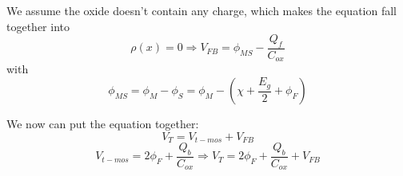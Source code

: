 We assume the oxide doesn't contain any charge, which makes the equation fall together into
\begin{equation}
\rho(x)=0
\Rightarrow
V_{FB}
=
\phi_{MS}-\frac{Q_f}{C_{ox}}
\end{equation}
with
\begin{equation}
\phi_{MS}
=
\phi_{M} - \phi_{S}
=
\phi_{M} -  \left(\chi + \frac{E_g}{2} + \phi_F \right)
\end{equation}

We now can put the equation together:
\begin{equation}
V_T = V_{t-mos} + V_{FB}
\end{equation}
\begin{equation}
V_{t-mos}=2 \phi_F + \frac{Q_b}{C_{ox}}
\Rightarrow
V_T = 2 \phi_F + \frac{Q_b}{C_{ox}} + V_{FB}
\end{equation}

